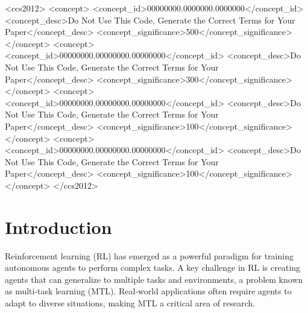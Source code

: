 \documentclass[sigconf]{acmart}
\begin{document}
\begin{CCSXML}
<ccs2012>
 <concept>
  <concept_id>00000000.0000000.0000000</concept_id>
  <concept_desc>Do Not Use This Code, Generate the Correct Terms for Your Paper</concept_desc>
  <concept_significance>500</concept_significance>
 </concept>
 <concept>
  <concept_id>00000000.00000000.00000000</concept_id>
  <concept_desc>Do Not Use This Code, Generate the Correct Terms for Your Paper</concept_desc>
  <concept_significance>300</concept_significance>
 </concept>
 <concept>
  <concept_id>00000000.00000000.00000000</concept_id>
  <concept_desc>Do Not Use This Code, Generate the Correct Terms for Your Paper</concept_desc>
  <concept_significance>100</concept_significance>
 </concept>
 <concept>
  <concept_id>00000000.00000000.00000000</concept_id>
  <concept_desc>Do Not Use This Code, Generate the Correct Terms for Your Paper</concept_desc>
  <concept_significance>100</concept_significance>
 </concept>
</ccs2012>
\end{CCSXML}





\maketitle

\section{Introduction}
Reinforcement learning (RL) has emerged as a powerful paradigm for 
training autonomous agents to perform complex tasks. A key challenge 
in RL is creating agents that can generalize to multiple tasks and 
environments, a problem known as multi-task learning (MTL). Real-world 
applications often require agents to adapt to diverse situations, 
making MTL a critical area of research.
\end{document}
